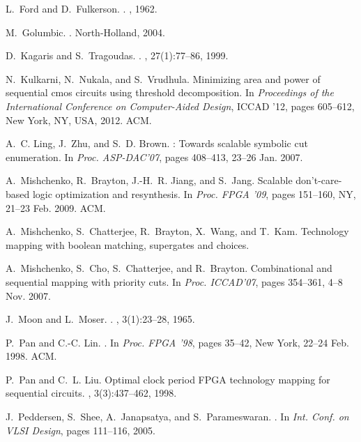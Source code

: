 \documentclass[journal]{IEEEtran}
\begin{document}
\begin{thebibliography}{10}
L.~Ford and D.~Fulkerson.
.
, 1962.

M.~Golumbic.
.
\newblock North-Holland, 2004.

D.~Kagaris and S.~Tragoudas.
.
, 27(1):77--86, 1999.

N.~Kulkarni, N.~Nukala, and S.~Vrudhula.
\newblock Minimizing area and power of sequential cmos circuits using threshold
  decomposition.
\newblock In {\em Proceedings of the International Conference on Computer-Aided
  Design}, ICCAD '12, pages 605--612, New York, NY, USA, 2012. ACM.

A.~C. Ling, J.~Zhu, and S.~D. Brown.
: Towards scalable symbolic cut enumeration.
\newblock In {\em Proc. ASP-DAC'07}, pages 408--413, 23--26 Jan. 2007.

A.~Mishchenko, R.~Brayton, J.-H.~R. Jiang, and S.~Jang.
\newblock Scalable don't-care-based logic optimization and resynthesis.
\newblock In {\em Proc. FPGA '09}, pages 151--160, NY, 21--23 Feb. 2009. ACM.

A.~Mishchenko, S.~Chatterjee, R.~Brayton, X.~Wang, and T.~Kam.
\newblock Technology mapping with boolean matching, supergates and choices.

A.~Mishchenko, S.~Cho, S.~Chatterjee, and R.~Brayton.
\newblock Combinational and sequential mapping with priority cuts.
\newblock In {\em Proc. ICCAD'07}, pages 354--361, 4--8 Nov. 2007.

J.~Moon and L.~Moser.
.
, 3(1):23--28, 1965.

P.~Pan and C.-C. Lin.
.
\newblock In {\em Proc. FPGA '98}, pages 35--42, New York, 22--24 Feb. 1998.
  ACM.

P.~Pan and C.~L. Liu.
\newblock Optimal clock period {FPGA} technology mapping for sequential
  circuits.
, 3(3):437--462, 1998.

J.~Peddersen, S.~Shee, A.~Janapsatya, and S.~Parameswaran.
.
\newblock In {\em Int. Conf. on VLSI Design}, pages 111--116, 2005.


\end{thebibliography}
\end{document}
